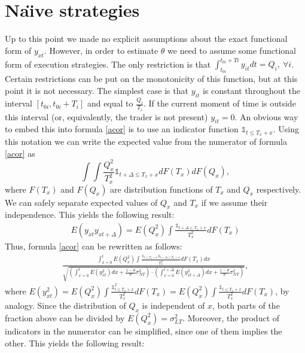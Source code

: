 \documentclass[12pt]{article}
\begin{document}
\section{Na\"{\i}ve strategies}\label{sec:naive}
Up to this point we made no explicit assumptions about the exact functional form of $y_{xt}$. However, in order to estimate $\theta$ we need to assume some functional form of execution strategies. The only restriction is that $\int_{t_{0i}}^{t_{0i}+Ti}y_{it}dt=Q_i,\ \forall i$. Certain restrictions can be put on the monotonicity of this function, but at this point it is not necessary. The simplest case is that $y_{it}$ is constant throughout the interval $[t_{0i},t_{0i}+T_i]$ and equal to $\frac{Q_i}{T_i}$. If the current moment of time is outside this interval (or, equivalently, the trader is not present) $y_{it}=0$. An obvious way to embed this into formula \eqref{acor} is to use an indicator function $\mathds{1}_{t\leq T_x+x}$. Using this notation we can write the expected value from the numerator of formula \eqref{acor} as 
$$\int\int\frac{Q_x^2}{T_x^2}\mathds{1}_{t+\Delta\leq T_x+x}dF(T_x)dF(Q_x),$$
where $F(T_x)$ and $F(Q_x)$ are distribution functions of $T_x$ and $Q_x$ respectively. We can safely separate expected values of $Q_x$ and $T_x$ if we assume their independence. This yields the following result:
\begin{equation}\label{adjcor}
\begin{gathered}
E(y_{xt}y_{xt+\Delta})=E(Q_x^2)\int\frac{\mathds{1}_{t+\Delta\leq T_x+x}}{T_x^2}dF(T_x)
\end{gathered}
\end{equation}
Thus, formula \eqref{acor} can be rewritten as follows:
\begin{equation*}\label{naiveind}
\begin{gathered}
\frac{\int_{x=0}^{t}E(Q_x^2)\int\frac{\mathds{1}_{t\leq T_x+x}\mathds{1}_{t+\Delta\leq T_x+x}}{T_x^2}dF(T_x)dx}
{\sqrt{(\int_{x=0}^{t}E(y_{xt}^2)dx+\frac{1-\theta}{\theta}\sigma^2_{NT})\cdot
(\int_{x=0}^{t+\Delta}E(y_{xt+\Delta}^2)dx+\frac{1-\theta}{\theta}\sigma^2_{NT})}},
\end{gathered}
\end{equation*}
where $E(y_{xt}^2)=E(Q_x^2)\int\frac{\mathds{1}^2_{t\leq T_x+x}}{T_x^2}dF(T_x)=E(Q_x^2)\int\frac{\mathds{1}_{t\leq T_x+x}}{T_x^2}dF(T_x)$, by analogy. Since the distribution of $Q_x$ is independent of $x$, both parts of the fraction above can be divided by $E(Q_x^2)=\sigma_{LT}^2$. Moreover, the product of indicators in the numerator can be simplified, since one of them implies the other. This yields the following result:
\end{document}
